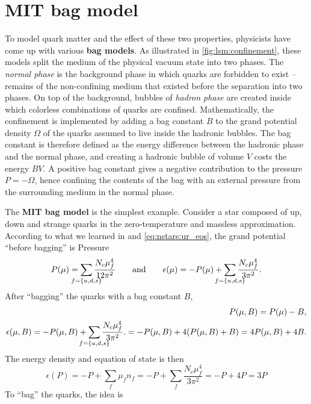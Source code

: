 \chapter{MIT bag model}

To model quark matter and the effect of these two properties,
physicists have come up with various \textbf{bag models}.
As illustrated in \cref{fig:lsm:confinement}, these models split the medium of the physical vacuum state into two phases.
The \emph{normal phase} is the background phase in which quarks are forbidden to exist -- remains of the non-confining medium that existed before the separation into two phases.
On top of the background, bubbles of \emph{hadron phase} are created inside which colorless combinations of quarks are confined.
Mathematically, the confinement is implemented by adding a bag constant $B$ to the grand potential density $\Omega$ of the quarks assumed to live inside the hadronic bubbles.
The bag constant is therefore defined as the energy difference between the hadronic phase and the normal phase,
and creating a hadronic bubble of volume $V$ costs the energy $B V$.
A positive bag constant gives a negative contribution to the pressure $P = -\Omega$,
hence confining the contents of the bag with an external pressure from the surrounding medium in the normal phase.

The \textbf{MIT bag model} is the simplest example.
Consider a star composed of up, down and strange quarks in the zero-temperature and massless approximation.
According to what we learned in  and \eqref{eq:nstars:ur_eos}, the grand potential ``before bagging'' is
Pressure
\begin{equation}
	P(\mu) = \smashoperator{\sum_{f=\{u,d,s\}}} \frac{N_c \mu_f^4}{12 \pi^2}
	\qquad \text{and} \qquad
	\epsilon(\mu) = -P(\mu) + \smashoperator{\sum_{f=\{u,d,s\}}} \frac{N_c \mu_f^4}{3 \pi^2}.
\end{equation}
After ``bagging'' the quarks with a bag constant $B$,
\begin{equation}
\begin{split}
	P(\mu,B) = P(\mu) - B, \\
	\epsilon(\mu,B) = -P(\mu,B) + \smashoperator{\sum_{f=\{u,d,s\}}} \frac{N_c \mu_f^4}{3 \pi^2}.
	                = -P(\mu,B) + 4 (P(\mu,B) + B) = 4 P(\mu,B) + 4 B.
\end{split}
\end{equation}
The energy density and equation of state is then
\begin{equation}
	\epsilon(P) = -P + \sum_f \mu_f n_f = -P + \sum_f \frac{N_c \mu_f^4}{3 \pi^2} = -P + 4P = 3P
\end{equation}
To ``bag'' the quarks, the idea is 

